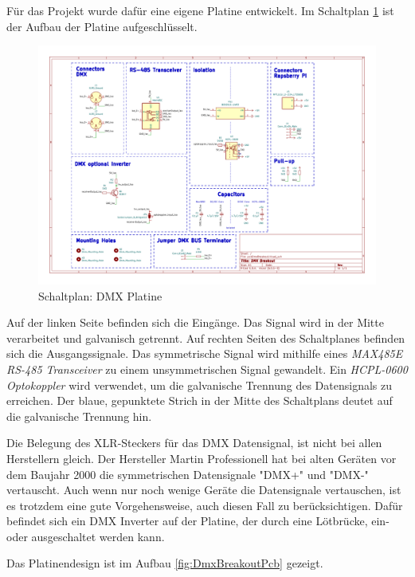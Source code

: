 Für das Projekt wurde dafür eine eigene Platine entwickelt.  Im Schaltplan \ref{fig:DmxBreakoutSchematic} ist der Aufbau der Platine aufgeschlüsselt.

\begin{figure}[H]
	\centering
	\includegraphics[width=1.0\linewidth]{Pictures/KicadPlatineSchematic}
	\caption{Schaltplan: DMX Platine}
	\label{fig:DmxBreakoutSchematic}
\end{figure}

Auf der linken Seite befinden sich die Eingänge. Das Signal wird in der Mitte verarbeitet und galvanisch getrennt. Auf rechten Seiten des Schaltplanes befinden sich die Ausgangssignale. Das symmetrische Signal wird mithilfe eines \emph{MAX485E RS-485 Transceiver} zu einem unsymmetrischen Signal gewandelt. Ein \emph{HCPL-0600 Optokoppler} wird verwendet, um die galvanische Trennung des Datensignals zu erreichen. Der blaue, gepunktete Strich in der Mitte des Schaltplans deutet auf die galvanische Trennung hin.

Die Belegung des XLR-Steckers für das DMX Datensignal, ist nicht bei allen Herstellern gleich.
Der Hersteller Martin Professionell hat bei alten Geräten vor dem Baujahr 2000 die symmetrischen Datensignale  "DMX+" und "DMX-" vertauscht.
Auch wenn nur noch wenige Geräte die Datensignale vertauschen, ist es trotzdem eine gute Vorgehensweise, auch diesen Fall zu berücksichtigen.
Dafür befindet sich ein DMX Inverter auf der Platine, der durch eine Lötbrücke, ein- oder ausgeschaltet werden kann.

Das Platinendesign ist im Aufbau \ref{fig:DmxBreakoutPcb} gezeigt.

